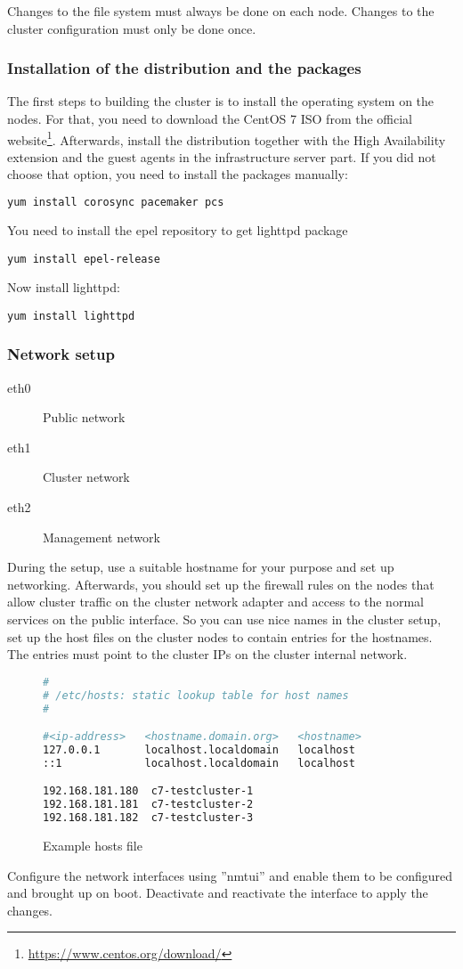 Changes to the file system must always be done on each node.
Changes to the cluster configuration must only be done once.
\subsubsection{Installation of the distribution and the packages}
The first steps to building the cluster is to install the operating system on the nodes.
For that, you need to download the CentOS 7 ISO from the official website\footnote{\url{https://www.centos.org/download/}}.
Afterwards, install the distribution together with the High Availability extension
and the guest agents in the infrastructure server part.
If you did not choose that option, you need to install the packages manually:
\begin{lstlisting}[language=sh]
yum install corosync pacemaker pcs
\end{lstlisting}
You need to install the \ac{epel} repository to get lighttpd package
\begin{lstlisting}
yum install epel-release
\end{lstlisting}
Now install lighttpd:
\begin{lstlisting}
yum install lighttpd
\end{lstlisting}
\subsubsection{Network setup}
\begin{description}
\item[eth0] Public network
\item[eth1] Cluster network
\item[eth2] Management network
\end{description}
During the setup, use a suitable hostname for your purpose and set up networking.
Afterwards, you should set up the firewall rules on the nodes that allow cluster traffic
on the cluster network adapter and access to the normal services on the public interface.
So you can use nice names in the cluster setup, set up the host files on the cluster
nodes to contain entries for the hostnames. The entries must point to the cluster IPs
on the cluster internal network.
\begin{figure}
\begin{lstlisting}[language=sh]
#
# /etc/hosts: static lookup table for host names
#

#<ip-address>   <hostname.domain.org>   <hostname>
127.0.0.1       localhost.localdomain   localhost
::1             localhost.localdomain   localhost

192.168.181.180  c7-testcluster-1
192.168.181.181  c7-testcluster-2
192.168.181.182  c7-testcluster-3
\end{lstlisting}
\caption{Example hosts file}
\end{figure}
Configure the network interfaces using ''nmtui'' and enable them to be configured
and brought up on boot. Deactivate and reactivate the interface to apply the changes.
